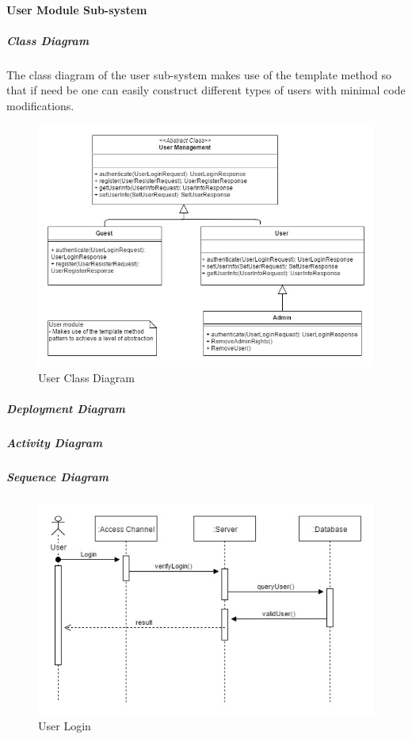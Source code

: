 
\paragraph{User Module Sub-system}
\subparagraph{Class Diagram}
The class diagram of the user sub-system makes use of the template method so that if need be one can easily construct different types of users with minimal code modifications.

\begin{figure}[H]
	\centering
	\includegraphics[width=\textwidth]{img/UserClassDiagram.jpg}
	\caption{User Class Diagram}
\end{figure}



\subparagraph{Deployment Diagram}

\begin{figure}[H]
\end{figure}


\subparagraph{Activity Diagram}

\begin{figure}[H]
\end{figure}


\subparagraph{Sequence Diagram}

\begin{figure}[H]
		\centering
		\includegraphics[width=\textwidth]{img/UserSequence.jpg}
		\caption{User Login}
\end{figure}



